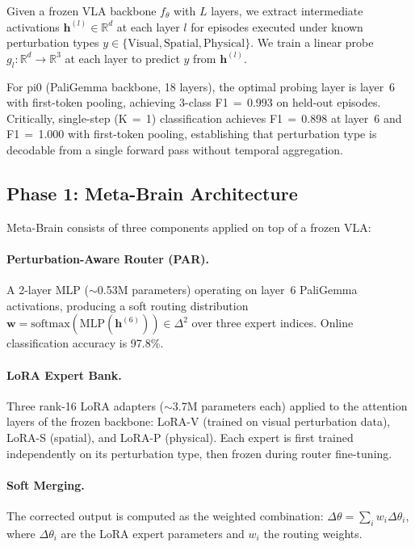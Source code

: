 \documentclass[letterpaper]{article}
\newcommand{\ours}{Meta-Brain}
\begin{document}
Given a frozen VLA backbone $f_\theta$ with $L$ layers, we extract intermediate activations $\mathbf{h}^{(l)} \in \mathbb{R}^d$ at each layer $l$ for episodes executed under known perturbation types $y \in \{\text{Visual}, \text{Spatial}, \text{Physical}\}$. We train a linear probe $g_l: \mathbb{R}^d \to \mathbb{R}^3$ at each layer to predict $y$ from $\mathbf{h}^{(l)}$.

For pi0 (PaliGemma backbone, 18 layers), the optimal probing layer is layer~6 with first-token pooling, achieving 3-class F1\,$=$\,0.993 on held-out episodes. Critically, single-step (K\,$=$\,1) classification achieves F1\,$=$\,0.898 at layer~6 and F1\,$=$\,1.000 with first-token pooling, establishing that perturbation type is decodable from a single forward pass without temporal aggregation.

\subsection{Phase 1: \ours{} Architecture}
\label{sec:architecture}

\ours{} consists of three components applied on top of a frozen VLA:

\paragraph{Perturbation-Aware Router (PAR).}
A 2-layer MLP ($\sim$0.53M parameters) operating on layer~6 PaliGemma activations, producing a soft routing distribution $\mathbf{w} = \text{softmax}(\text{MLP}(\mathbf{h}^{(6)})) \in \Delta^2$ over three expert indices. Online classification accuracy is 97.8\%.

\paragraph{LoRA Expert Bank.}
Three rank-16 LoRA adapters ($\sim$3.7M parameters each) applied to the attention layers of the frozen backbone: LoRA-V (trained on visual perturbation data), LoRA-S (spatial), and LoRA-P (physical). Each expert is first trained independently on its perturbation type, then frozen during router fine-tuning.

\paragraph{Soft Merging.}
The corrected output is computed as the weighted combination: $\Delta\theta = \sum_i w_i \Delta\theta_i$, where $\Delta\theta_i$ are the LoRA expert parameters and $w_i$ the routing weights.
\end{document}
